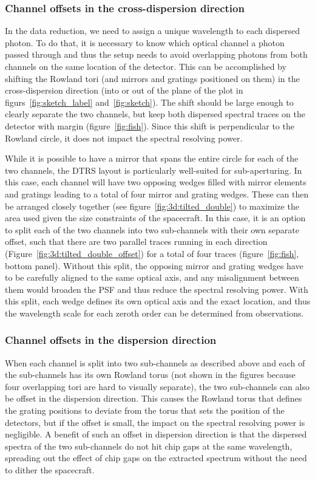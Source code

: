 \documentclass[linenumbers]{aastex631}
\begin{document}
\subsubsection{Channel offsets in the cross-dispersion direction}
In the data reduction, we need to assign a unique wavelength to each dispersed photon. To do that, it is necessary to know which optical channel a photon passed through and thus the setup needs to avoid overlapping photons from both channels on the same location of the detector. This can be accomplished by shifting the Rowland tori (and mirrors and gratings positioned on them) in the cross-dispersion direction (into or out of the plane of the plot in figurs~\ref{fig:sketch_label} and~\ref{fig:sketch}). The shift should be large enough to clearly separate the two channels, but keep both dispersed spectral traces on the detector with margin (figure~\ref{fig:fish}). Since this shift is perpendicular to the Rowland circle, it does not impact the spectral resolving power.

While it is possible to have a mirror that spans the entire circle for each of the two channels, the DTRS layout is particularly well-suited for sub-aperturing. In this case, each channel will have two opposing wedges filled with mirror elements and gratings leading to a total of four mirror and grating wedges. These can then be arranged closely together (see figure~\ref{fig:3d:tilted_double}) to maximize the area used given the size constraints of the spacecraft. In this case, it is an option to split each of the two channels into two sub-channels with their own separate offset, such that there are two parallel traces running in each direction (Figure~\ref{fig:3d:tilted_double_offset}) for a total of four traces (figure~\ref{fig:fish}, bottom panel). Without this split, the opposing mirror and grating wedges have to be carefully aligned to the same optical axis, and any misalignment between them would broaden the PSF and thus reduce the spectral resolving power. With this split, each wedge defines its own optical axis and the exact location, and thus the wavelength scale for each zeroth order can be determined from observations.

\subsubsection{Channel offsets in the dispersion direction}
When each channel is split into two sub-channels as described above and each of the sub-channels has its own Rowland torus (not shown in the figures because four overlapping tori are hard to visually separate), the two sub-channels can also be offset in the dispersion direction. This causes the Rowland torus that defines the grating positions to deviate from the torus that sets the position of the detectors, but if the offset is small, the impact on the spectral resolving power is negligible. A benefit of such an offset in dispersion direction is that the dispersed spectra of the two sub-channels do not hit chip gaps at the same wavelength, spreading out the effect of chip gaps on the extracted spectrum without the need to dither the spacecraft.
\end{document}
